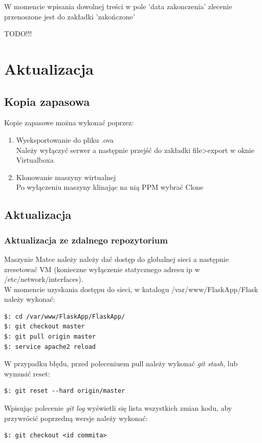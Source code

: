 \documentclass[12pt,a4paper]{article}
\begin{document}
W momencie wpisania dowolnej treści w pole 'data zakonczenia' zlecenie przenoszone jest do zakładki 'zakończone'
  \\
\begin{center}
TODO!!!
\end{center}

\section{Aktualizacja}
\subsection{Kopia zapasowa}
\quad
Kopie zapasowe można wykonać poprzez:
\begin{enumerate}
\item Wyeksportowanie do pliku .ova\\
Należy wyłączyć serwer a następnie przejść do zakładki file>export w oknie Virtualboxa
\item Klonowanie maszyny wirtualnej\\
Po wyłączeniu maszyny klinając na nią PPM wybrać Clone
\end{enumerate}

\subsection{Aktualizacja}
\subsubsection{Aktualizacja ze zdalnego repozytorium}
\quad
Maszynie Matce należy należy dać dostęp do globalnej sieci a następnie zresetować VM (konieczne wyłączenie statycznego adresu ip w /etc/network/interfaces).\\   

W momencie uzyskania  dostępu do sieci, w katalogu /var/www/FlaskApp/Flask należy wykonać:
\begin{lstlisting}
$: cd /var/www/FlaskApp/FlaskApp/
$: git checkout master
$: git pull origin master
$: service apache2 reload
\end{lstlisting}
W przypadku błędu, przed poleceniuem pull należy wykonać \textit{git stash}, lub wymusić reset:
\begin{lstlisting}
$: git reset --hard origin/master
\end{lstlisting}
Wpisując polecenie \textit{git log} wyświetli się lista wszystkich zmian kodu, aby przywrócić poprzedną wersje należy wykonać:
\begin{lstlisting}
$: git checkout <id commita>
\end{lstlisting}
\quad
\end{document}
